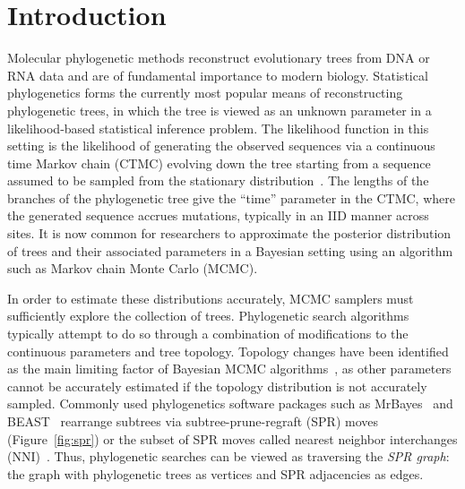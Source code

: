 \documentclass[11pt,onecolumn,conference]{IEEEtran}
\begin{document}
\pagebreak


\section{Introduction}
Molecular phylogenetic methods reconstruct evolutionary trees from DNA or RNA data and are of fundamental importance to modern biology.
Statistical phylogenetics forms the currently most popular means of reconstructing phylogenetic trees, in which the tree is viewed as an unknown parameter in a likelihood-based statistical inference problem.
The likelihood function in this setting is the likelihood of generating the observed sequences via a continuous time Markov chain (CTMC) evolving down the tree starting from a sequence assumed to be sampled from the stationary distribution~\cite{felsenstein1981evolutionary}.
The lengths of the branches of the phylogenetic tree give the ``time'' parameter in the CTMC, where the generated sequence accrues mutations, typically in an IID manner across sites.
It is now common for researchers to approximate the posterior distribution of trees and their associated parameters in a Bayesian setting using an algorithm such as Markov chain Monte Carlo (MCMC).

In order to estimate these distributions accurately, MCMC samplers must sufficiently explore the collection of trees.
Phylogenetic search algorithms typically attempt to do so through a combination of modifications to the continuous parameters and tree topology.
Topology changes have been identified as the main limiting factor of Bayesian MCMC algorithms~\cite{lakner2008efficiency,hohna2012guided}, as other parameters cannot be accurately estimated if the topology distribution is not accurately sampled.
Commonly used phylogenetics software packages such as MrBayes~\cite{Ronquist2012-hi} and BEAST~\cite{bouckaert2014beast} rearrange subtrees via subtree-prune-regraft (SPR) moves (Figure~\ref{fig:spr}) or the subset of SPR moves called nearest neighbor interchanges (NNI)~\cite{robinson1971comparison}.
Thus, phylogenetic searches can be viewed as traversing the \emph{SPR graph}: the graph with phylogenetic trees as vertices and SPR adjacencies as edges.
\end{document}
